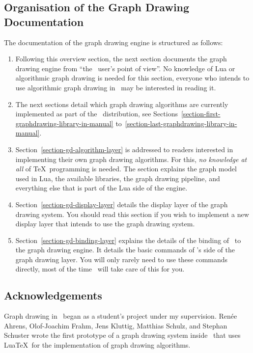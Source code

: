 \subsection{Organisation of the Graph Drawing Documentation}

The documentation of the graph drawing engine is structured as
follows:
\begin{enumerate}
\item Following this overview section, the next section documents
  the graph drawing engine from ``the \tikzname\ user's point of
  view''. No knowledge of Lua or algorithmic graph drawing is needed
  for this section, everyone who intends to use algorithmic graph
  drawing in \tikzname\ may be interested in reading it.
\item The next sections detail which graph drawing algorithms are
  currently implemented as part of the \tikzname\ distribution, see
  Sections~\ref{section-first-graphdrawing-library-in-manual}
  to~\ref{section-last-graphdrawing-library-in-manual}.
\item
  Section~\ref{section-gd-algorithm-layer} is addressed to readers
  interested in implementing their own graph drawing
  algorithms. For this, \emph{no knowledge at all} of \TeX\
  programming is needed. The section explains the graph model used in
  Lua, the available libraries, the graph drawing pipeline, and everything
  else that is part of the Lua side of the engine.
\item
  Section~\ref{section-gd-display-layer} details the
  display layer of the graph drawing system.  You should read this 
  section if you wish to implement a new display layer that intends to
  use the graph drawing system.
\item
  Section~\ref{section-gd-binding-layer} explains the details of the
  binding of \pgfname\ to the graph drawing engine. It
  details the basic commands of \pgfname's side of the graph drawing
  layer. You will only rarely need to use these commands directly,
  most of the time \tikzname\ will take care of this for you.
\end{enumerate}



\subsection{Acknowledgements}

Graph drawing in \tikzname\ began as a student's project under my
supervision. Ren\'ee Ahrens, Olof-Joachim Frahm, Jens
Kluttig, Matthias Schulz, and Stephan Schuster wrote the first
prototype of a graph drawing system inside \tikzname\ that uses
Lua\TeX\ for the implementation of graph drawing algorithms.

